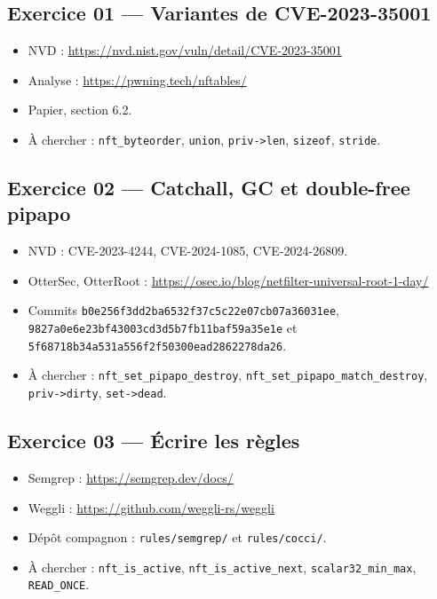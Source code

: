 \documentclass{training}
\begin{document}
\subsection*{Exercice 01 --- Variantes de CVE-2023-35001}
\begin{itemize}
  \item NVD : \url{https://nvd.nist.gov/vuln/detail/CVE-2023-35001}
  \item Analyse : \url{https://pwning.tech/nftables/}
  \item Papier, section 6.2.
  \item À chercher : \texttt{nft\_byteorder}, \texttt{union},
        \texttt{priv->len}, \texttt{sizeof}, \texttt{stride}.
\end{itemize}

\subsection*{Exercice 02 --- Catchall, GC et double-free pipapo}
\begin{itemize}
  \item NVD : CVE-2023-4244, CVE-2024-1085, CVE-2024-26809.
  \item OtterSec, OtterRoot :
        \url{https://osec.io/blog/netfilter-universal-root-1-day/}
  \item Commits \texttt{b0e256f3dd2ba6532f37c5c22e07cb07a36031ee},
        \texttt{9827a0e6e23bf43003cd3d5b7fb11baf59a35e1e} et
        \texttt{5f68718b34a531a556f2f50300ead2862278da26}.
  \item À chercher : \texttt{nft\_set\_pipapo\_destroy},
        \texttt{nft\_set\_pipapo\_match\_destroy}, \texttt{priv->dirty},
        \texttt{set->dead}.
\end{itemize}

\subsection*{Exercice 03 --- Écrire les règles}
\begin{itemize}
  \item Semgrep : \url{https://semgrep.dev/docs/}
  \item Weggli : \url{https://github.com/weggli-rs/weggli}
  \item Dépôt compagnon : \texttt{rules/semgrep/} et \texttt{rules/cocci/}.
  \item À chercher : \texttt{nft\_is\_active}, \texttt{nft\_is\_active\_next},
        \texttt{scalar32\_min\_max}, \texttt{READ\_ONCE}.
\end{itemize}
\end{document}
